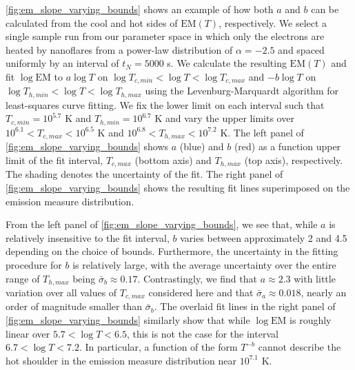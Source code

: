 \documentclass[preprint]{aastex}
\begin{document}
	\par\autoref{fig:em_slope_varying_bounds} shows an example of how both $a$ and $b$ can be calculated from the cool and hot sides of $\mathrm{EM}(T)$, respectively. We select a single sample run from our parameter space in which only the electrons are heated by nanoflares from a power-law distribution of $\alpha=-2.5$ and spaced uniformly by an interval of $t_N=5000$ s. We calculate the resulting $\mathrm{EM}(T)$ and fit $\log{\mathrm{EM}}$ to $a\log{T}$ on $\log{T_{c,min}}<\log{T}<\log{T_{c,max}}$ and $-b\log{T}$ on $\log{T_{h,min}}<\log{T}<\log{T_{h,max}}$ using the Levenburg-Marquardt algorithm for least-squares curve fitting. We fix the lower limit on each interval such that $T_{c,min}=10^{5.7}$ K and $T_{h,min} = 10^{6.7}$  K and vary the upper limits over $10^{6.1}<T_{c,max}<10^{6.5}$ K and $10^{6.8}<T_{h,max}<10^{7.2}$ K. The left panel of \autoref{fig:em_slope_varying_bounds} shows $a$ (blue) and $b$ (red) as a function upper limit of the fit interval, $T_{c,max}$ (bottom axis) and $T_{h,max}$ (top axis), respectively. The shading denotes the uncertainty of the fit. The right panel of \autoref{fig:em_slope_varying_bounds} shows the resulting fit lines superimposed on the emission measure distribution.
	\par From the left panel of \autoref{fig:em_slope_varying_bounds}, we see that, while $a$ is relatively insensitive to the fit interval, $b$ varies between approximately 2 and 4.5 depending on the choice of bounds. Furthermore, the uncertainty in the fitting procedure for $b$ is relatively large, with the average uncertainty over the entire range of $T_{h,max}$ being $\bar{\sigma}_b\approx0.17$. Contrastingly, we find that $a\approx2.3$ with little variation over all values of $T_{c,max}$ considered here and that $\bar{\sigma}_a\approx0.018$, nearly an order of magnitude smaller than $\bar{\sigma}_b$. The overlaid fit lines in the right panel of \autoref{fig:em_slope_varying_bounds} similarly show that while $\log{\mathrm{EM}}$ is roughly linear over $5.7<\log{T}<6.5$, this is not the case for the interval $6.7<\log{T}<7.2$. In particular, a function of the form $T^{-b}$ cannot describe the hot shoulder in the emission measure distribution near $10^{7.1}$ K.
\end{document}

